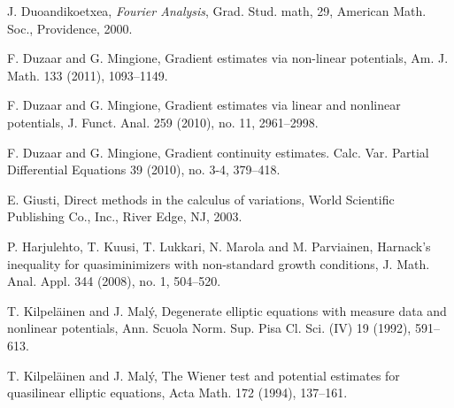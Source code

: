 \documentclass[a4paper,10pt]{amsart}
\begin{document}
\begin{thebibliography}{999}
	
	
	
	 J. Duoandikoetxea, {\it Fourier Analysis}, Grad. Stud. math, 29, American Math. Soc., Providence, 2000.
	
	 F. Duzaar and G. Mingione, Gradient estimates via non-linear potentials, Am. J. Math. 133 (2011), 1093--1149.
	
	  F. Duzaar and G. Mingione, Gradient estimates via linear and nonlinear potentials, J. Funct. Anal. 259 (2010), no. 11, 2961--2998.
	
	  F. Duzaar and G. Mingione, Gradient continuity estimates. Calc. Var. Partial Differential Equations 39 (2010), no. 3-4, 379--418.
	
	
	 E. Giusti, Direct methods in the calculus of variations, World Scientific Publishing Co., Inc., River Edge, NJ, 2003.
	
	
	
	 P. Harjulehto, T. Kuusi, T. Lukkari, N. Marola and M. Parviainen, Harnack’s inequality for quasiminimizers
	with non-standard growth conditions, J. Math. Anal. Appl. 344 (2008), no. 1, 504--520.
	
	
	
	
	
	
	 T. Kilpel\"ainen and J.  Mal\'y, Degenerate elliptic equations with measure data and nonlinear potentials, Ann. Scuola Norm. Sup. Pisa Cl. Sci. (IV) 19 (1992), 591--613.
	
	 T. Kilpel\"ainen and J.  Mal\'y, The Wiener test and potential estimates for quasilinear elliptic equations, Acta Math. 172 (1994), 137--161.
	 

\end{thebibliography}
\end{document}
